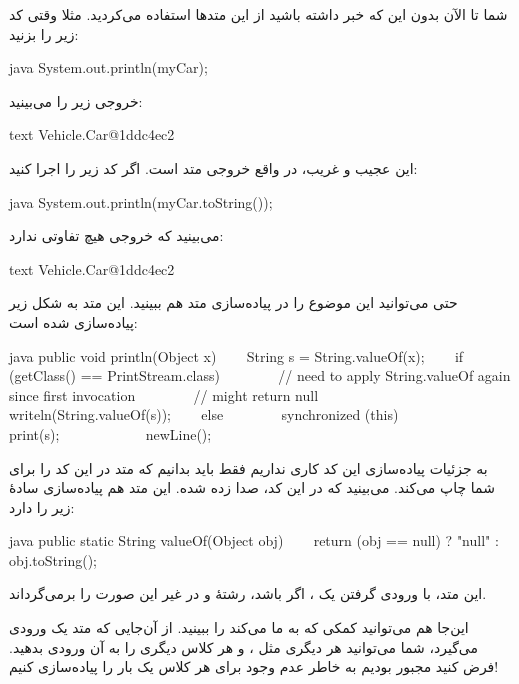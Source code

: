 شما تا الآن بدون این که خبر داشته باشید از این متدها استفاده می‌کردید.
مثلا وقتی کد زیر را بزنید:

\begin{codebox}{java}
System.out.println(myCar);
\end{codebox}

خروجی زیر را می‌بینید:

\begin{codebox}{text}
Vehicle.Car@1ddc4ec2
\end{codebox}

این  عجیب و غریب، در واقع خروجی متد
 است. اگر کد زیر را اجرا کنید:

\begin{codebox}{java}
System.out.println(myCar.toString());
\end{codebox}

می‌بینید که خروجی هیچ تفاوتی ندارد:

\begin{codebox}{text}
Vehicle.Car@1ddc4ec2
\end{codebox}

حتی می‌توانید این موضوع را در پیاده‌سازی متد
 هم ببینید. این متد به شکل زیر
پیاده‌سازی شده است:

\begin{codebox}{java}
public void println(Object x) {  
    String s = String.valueOf(x);
    if (getClass() == PrintStream.class) {
        // need to apply String.valueOf again since first invocation  
        // might return null
        writeln(String.valueOf(s));  
    } else {
        synchronized (this) {  
            print(s);  
            newLine();  
        }  
    }  
}
\end{codebox}

به جزئیات پیاده‌سازی این کد کاری نداریم فقط باید بدانیم که متد
 در این کد  را برای شما چاپ می‌کند.
می‌بینید که در این کد،  صدا زده شده. این
متد هم پیاده‌سازی سادهٔ زیر را دارد:

\begin{codebox}{java}
public static String valueOf(Object obj) {
    return (obj == null) ? "null" : obj.toString();  
}
\end{codebox}

این متد، با ورودی گرفتن یک  ، اگر  باشد،
رشتهٔ  و در غیر این صورت 
را برمی‌گرداند.

این‌جا هم می‌توانید کمکی که  به ما می‌کند را ببینید. از
آن‌جایی که متد  یک  ورودی می‌گیرد، شما
می‌توانید هر  دیگری مثل  ،
 و هر کلاس دیگری را به آن ورودی بدهید. فرض کنید مجبور
بودیم به خاطر عدم وجود  برای هر کلاس یک بار
 را پیاده‌سازی کنیم!

